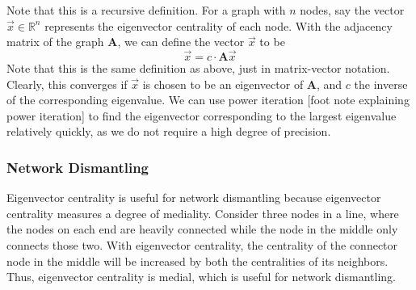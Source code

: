 \documentclass{article}
\begin{document}
Note that this is a recursive definition. For a graph with $n$ nodes, say the vector $\Vec{x} \in \mathbb{R}^n$ represents the eigenvector centrality of each node. With the adjacency matrix of the graph \textbf{A}, we can define the vector $\Vec{x}$ to be $$\Vec{x} = c \cdot \textbf{A} \Vec{x}$$ Note that this is the same definition as above, just in matrix-vector notation. Clearly, this converges if $\Vec{x}$ is chosen to be an eigenvector of \textbf{A}, and $c$ the inverse of the corresponding eigenvalue. We can use power iteration [foot note explaining power iteration] to find the eigenvector corresponding to the largest eigenvalue relatively quickly, as we do not require a high degree of precision.

\subsubsection{Network Dismantling}
Eigenvector centrality is useful for network dismantling because eigenvector centrality measures a degree of mediality. Consider three nodes in a line, where the nodes on each end are heavily connected while the node in the middle only connects those two. With eigenvector centrality, the centrality of the connector node in the middle will be increased by both the centralities of its neighbors. Thus, eigenvector centrality is medial, which is useful for network dismantling.
\end{document}
